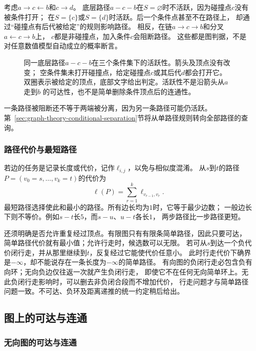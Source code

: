 考虑\(a\to c\leftarrow b\)和\(c\to d\)。
底层路径\(a-c-b\)在\(S=\varnothing\)时不活跃，因为碰撞点\(c\)没有被条件打开；
在\(S=\{c\}\)或\(S=\{d\}\)时活跃。后一个条件点甚至不在路径上，
却通过“碰撞点有后代被给定”的规则影响路径。
相反，在链\(a\to c\to b\)和分叉\(a\leftarrow c\to b\)上，
\(c\)都是非碰撞点，加入条件\(c\)会阻断路径。
这些都是图判据，不是对任意数值模型自动成立的概率断言。

\begin{figure}[htbp]
  \centering
  
  \caption{同一底层路径\(a-c-b\)在三个条件集下的活跃性。箭头及顶点没有改变；
  空条件集未打开碰撞点，给定碰撞点\(c\)或其后代\(d\)都会打开它。
  双圈表示被给定的顶点，底部文字给出判定。活跃性不是沿箭头从\(a\)走到\(b\)
  的可达性，也不是简单删除条件顶点后的连通性。}
  \label{fig:graph-theory-active-paths}
\end{figure}

一条路径被阻断还不等于两端被分离，因为另一条路径可能仍活跃。
第~\ref{sec:graph-theory-conditional-separation}节将从单路径规则转向全部路径的查询。

\subsubsection{路径代价与最短路径}

若边的任务是记录长度或代价，记作\(\ell_{i,j}\)，以免与相似度混淆。
从\(s\)到\(t\)的路径\(P=(v_0=s,\ldots,v_k=t)\)的代价为
\[
  \ell(P)=\sum_{r=1}^{k}\ell_{v_{r-1},v_r}.
\]
最短路径选择使此和最小的路径。所有边长均为\(1\)时，它等于最少边数；
一般边长下则不等价。例如\(s-t\)长\(5\)，而\(s-u\)、\(u-t\)各长\(1\)，
两步路径比一步路径更短。

还须明确是否允许重复经过顶点。有限图只有有限条简单路径，因此只要可达，
简单路径代价就有最小值；允许行走时，候选数可以无限。
若可从\(s\)到达一个负代价闭行走，并从那里继续到\(t\)，反复经过它能使代价任意小。
此时行走代价下确界是\(-\infty\)，却不能说存在一条长度为\(-\infty\)的简单路径。
有向图的负闭行走必包含负有向环；无向负边仅往返一次就产生负闭行走，
即使它不在任何无向简单环上。无此负闭行走影响时，可以删去非负闭合段而不增加代价，
行走问题才与简单路径问题一致。不可达、负环及距离递推的统一约定稍后给出。

\subsection{图上的可达与连通}

\subsubsection{无向图的可达与连通}

